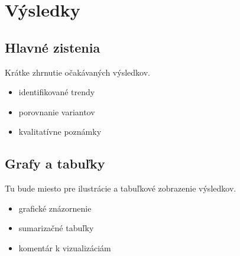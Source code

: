 \section{Výsledky}
\subsection{Hlavné zistenia}
Krátke zhrnutie očakávaných výsledkov.
\begin{itemize}
  \item identifikované trendy
  \item porovnanie variantov
  \item kvalitatívne poznámky
\end{itemize}

\subsection{Grafy a tabuľky}
Tu bude miesto pre ilustrácie a tabuľkové zobrazenie výsledkov.
\begin{itemize}
  \item grafické znázornenie
  \item sumarizačné tabuľky
  \item komentár k vizualizáciám
\end{itemize}
